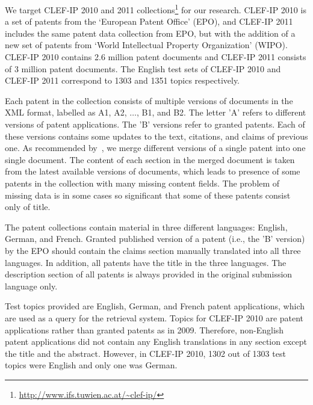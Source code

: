 We target CLEF-IP 2010 and 2011 collections\footnote{\url{http://www.ifs.tuwien.ac.at/~clef-ip/}}
for our research. CLEF-IP 2010 is a set of patents from the `European Patent Office' (EPO), and CLEF-IP 2011 includes the same patent data collection from EPO, but with the addition of a new set of patents from `World Intellectual Property Organization' (WIPO). CLEF-IP 2010 contains 2.6 million patent documents and CLEF-IP 2011 consists of 3 million patent documents. The English test sets of CLEF-IP 2010 and CLEF-IP 2011 correspond to 1303 and 1351 topics respectively.

Each patent in the collection consists of multiple versions of documents in the XML format, labelled as A1, A2, $\ldots$, B1, and B2. The letter 'A' refers to different versions of patent applications. The 'B' versions refer to granted patents. Each of these versions contains some updates to the text, citations, and claims of previous one. As recommended by~\cite{magdy2012toward}, we merge different versions of a single patent into one single document. The content of each section in the merged document is taken from the latest available versions of documents, which leads to presence of some patents in the collection with many missing content fields. The problem of missing data is in some cases so significant that some of these patents consist only of title.

The patent collections contain material in three different languages: English, German, and French. Granted published version of a patent (i.e., the 'B' version) by the EPO should contain the claims section manually translated into all three languages. In addition, all patents have the title in the three languages. The description section of all patents is always provided in the original submission language only.

Test topics provided are English, German, and French patent applications, which are used as a query for the retrieval system. Topics for CLEF-IP 2010 are patent applications rather than granted patents as in 2009. Therefore, non-English patent applications did not contain any English translations in any section except the title and the abstract. However, in CLEF-IP 2010, 1302 out of 1303 test topics were English and only one was German. 

